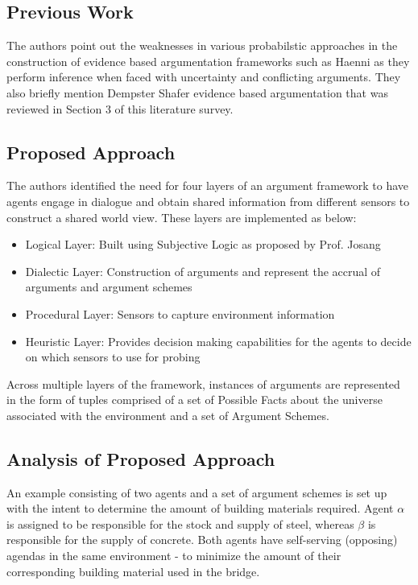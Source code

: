 \documentclass[UTF8]{article}
\begin{document}
\subsection{Previous Work}
The authors point out the weaknesses in various probabilstic approaches in the construction of evidence based argumentation frameworks such as Haenni \cite{Haenni2005TowardsAU} as they perform 
inference when faced with uncertainty and conflicting arguments. They also briefly mention Dempster Shafer evidence based argumentation that was reviewed in Section 3 of this literature survey.

\subsection{Proposed Approach}
The authors identified the need for four layers of an argument framework to have agents engage in dialogue 
and obtain shared information from different sensors to construct a shared world view. These layers are implemented as below:
\begin{itemize}
  \item Logical Layer: Built using Subjective Logic as proposed by Prof. Josang
  \item Dialectic Layer: Construction of arguments and represent the accrual of arguments and argument schemes
  \item Procedural Layer: Sensors to capture environment information
  \item Heuristic Layer: Provides decision making capabilities for the agents to decide on which sensors to use for probing
\end{itemize}

Across multiple layers of the framework, instances of arguments are represented in the form 
of tuples comprised of a set of Possible Facts about the universe associated with the environment and a set of Argument Schemes.

\subsection{Analysis of Proposed Approach}
An example consisting of two agents and a set of argument schemes is set up with the intent to determine the amount of building materials required. Agent $\alpha$ is 
assigned to be responsible for the stock and supply of steel, whereas $\beta$ is responsible for the supply of concrete. Both agents have self-serving (opposing) 
agendas in the same environment - to minimize the amount of their corresponding building material used in the bridge.
\end{document}
